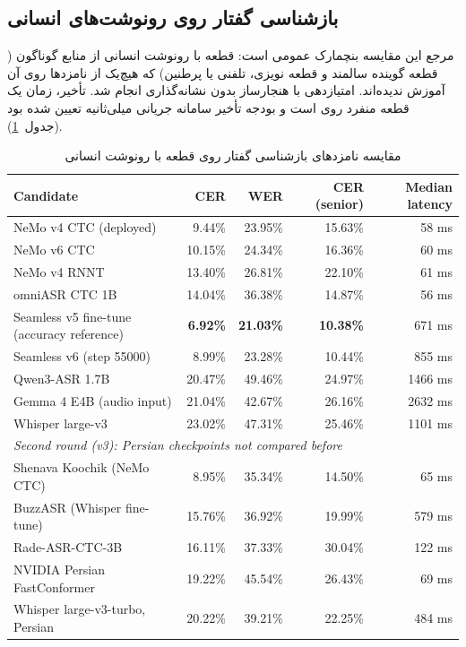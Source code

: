 \subsection{بازشناسی گفتار روی رونوشت‌های انسانی}

مرجع این مقایسه بنچمارک عمومی  است:  قطعه با رونوشت انسانی
از منابع گوناگون ( قطعه گوینده سالمند و  قطعه نویزی، تلفنی یا
پرطنین) که هیچ‌یک از نامزدها روی آن آموزش ندیده‌اند. امتیازدهی با هنجارساز
بدون نشانه‌گذاری انجام شد. تأخیر، زمان یک قطعه منفرد روی  است و
بودجه تأخیر سامانه جریانی  میلی‌ثانیه تعیین شده بود
(جدول~\ref{tab:asr-v2}).

\begin{table}[ht]
\centering
\caption{مقایسه نامزدهای بازشناسی گفتار روی  قطعه  با رونوشت انسانی}
\label{tab:asr-v2}
\small
\begin{latin}
\begin{tabular}{lrrrr}
\toprule
Candidate & CER & WER & CER (senior) & Median latency \\
\midrule
NeMo v4 CTC (deployed) & 9.44\% & 23.95\% & 15.63\% & 58 ms \\
NeMo v6 CTC & 10.15\% & 24.34\% & 16.36\% & 60 ms \\
NeMo v4 RNNT & 13.40\% & 26.81\% & 22.10\% & 61 ms \\
omniASR CTC 1B & 14.04\% & 36.38\% & 14.87\% & 56 ms \\
Seamless v5 fine-tune (accuracy reference) & \textbf{6.92\%} & \textbf{21.03\%} & \textbf{10.38\%} & 671 ms \\
Seamless v6 (step 55000) & 8.99\% & 23.28\% & 10.44\% & 855 ms \\
Qwen3-ASR 1.7B & 20.47\% & 49.46\% & 24.97\% & 1466 ms \\
Gemma 4 E4B (audio input) & 21.04\% & 42.67\% & 26.16\% & 2632 ms \\
Whisper large-v3 & 23.02\% & 47.31\% & 25.46\% & 1101 ms \\
\midrule
\multicolumn{5}{l}{\emph{Second round (v3): Persian checkpoints not compared before}} \\
Shenava Koochik (NeMo CTC) & 8.95\% & 35.34\% & 14.50\% & 65 ms \\
BuzzASR (Whisper fine-tune) & 15.76\% & 36.92\% & 19.99\% & 579 ms \\
Rade-ASR-CTC-3B & 16.11\% & 37.33\% & 30.04\% & 122 ms \\
NVIDIA Persian FastConformer & 19.22\% & 45.54\% & 26.43\% & 69 ms \\
Whisper large-v3-turbo, Persian & 20.22\% & 39.21\% & 22.25\% & 484 ms \\

\end{tabular}
\end{latin}
\end{table}
